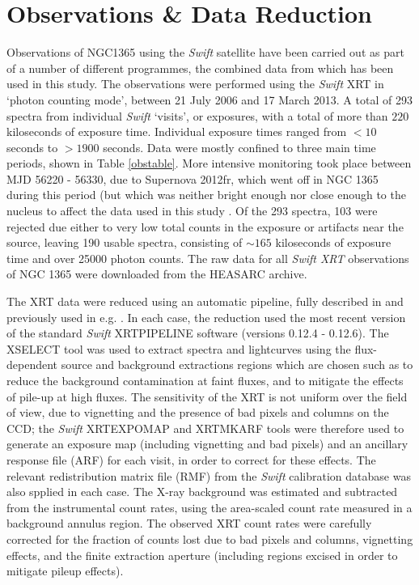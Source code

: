 \documentclass[useAMS,usenatbib]{sam}
\begin{document}
\section{Observations \& Data Reduction}

Observations of NGC1365 using the {\it Swift} satellite have been carried out as part of a number of different programmes, the combined data from which has been used in
this
study. The observations were performed using the {\it Swift} XRT in `photon counting mode', between 21 July 2006 and 17 March 2013. A total of 293 spectra from individual
{\it Swift} `visits', or exposures, with a total of more than $220$ kiloseconds of exposure time. Individual exposure times ranged from $<10$ seconds to $>1900$ seconds.
Data were mostly confined to three main time periods, shown in Table \ref{obstable}. More intensive monitoring took place between MJD 56220 - 56330, due to Supernova
2012fr, which went off in NGC 1365 during this period (but which was neither bright enough nor close enough to the nucleus to affect the data used in this study 
\citep[e.g.][]{klotz,childress}. Of the 293 spectra, 103 were rejected due either to very low total counts in the exposure or artifacts near the source,
leaving 190 usable spectra, consisting of $\sim165$ kiloseconds of exposure time and over 25000 photon counts. The raw data for all {\it Swift XRT} observations of NGC
1365 were downloaded from the HEASARC archive.

The XRT data were reduced using an automatic pipeline, fully described in \citet{fabian12} and previously used in e.g. \citet{cameron}. In each case, the reduction used
the most recent version of the standard {\it Swift} XRTPIPELINE software (versions 0.12.4 - 0.12.6). The XSELECT tool was used to extract spectra and lightcurves using
the flux-dependent source and background extractions regions which are chosen such as to reduce the background contamination at faint fluxes, and to mitigate the effects
of pile-up at high fluxes. The sensitivity of the XRT is not uniform over the field of view, due to vignetting and the presence of bad pixels and columns on the CCD; the
{\it Swift} XRTEXPOMAP and XRTMKARF tools were therefore used to generate an exposure map (including vignetting and bad pixels) and an ancillary response file (ARF) for
each visit, in order to correct for these effects. The relevant redistribution matrix file (RMF) from the {\it Swift} calibration database was also spplied in each case.
The X-ray background was estimated and subtracted from the instrumental count rates, using the area-scaled count rate measured in a background annulus region. The
observed XRT count rates were carefully corrected for the fraction of counts lost due to bad pixels and columns, vignetting effects, and
the finite extraction aperture (including regions excised in order to mitigate pileup effects).
\end{document}
